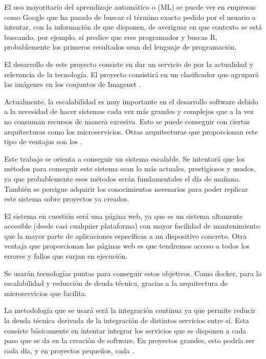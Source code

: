 

El uso mayoritario del aprendizaje automático o  (ML) se puede ver en empresas como Google que ha pasado de buscar el término exacto pedido por el usuario a intentar, con la información de que disponen, de averiguar en que contexto se está buscando, por ejemplo, si predice que eres programador y buscas R, probablemente los primeros resultados sean del lenguaje de programación.

El desarrollo de este proyecto consiste en dar un servicio de  por la actualidad y relevancia de la tecnología. El proyecto consistirá en un clasificador que agrupará las imágenes en los conjuntos de Imagenet \cite{imnet}.

Actualmente, la escalabilidad es muy importante en el desarrollo software debido a la necesidad de hacer sistemas cada vez más grandes y complejos que a la vez no consuman recursos de manera excesiva. Esto se puede conseguir con ciertas arquitecturas como los microservicios. Otras arquitecturas que proporcionan este tipo de ventajas son los  \cite{svlops, svless}.

Este trabajo se orienta a conseguir un sistema escalable. Se intentará que los métodos para conseguir este sistema sean lo más actuales, prestigiosos y usados, ya que probablemente esos métodos serán fundamentales el día de mañana. También se persigue adquirir los conocimientos necesarios para poder replicar este sistema sobre proyectos ya creados.

El sistema en cuestión será una página web, ya que es un sistema altamente accesible (desde casi cualquier plataforma) con mayor facilidad de mantenimiento que la mayor parte de aplicaciones específicas a un dispositivo concreto. Otra ventaja que proporcionan las páginas web es que tendremos acceso a todos los errores y fallos que surjan en ejecución.

Se usarán tecnologías puntas para conseguir estos objetivos. Como docker, para la escalabilidad y reducción de deuda técnica, gracias a la arquitectura de microservicios que facilita.

La metodología que se usará será la integración continua ya que permite reducir la deuda técnica derivada de la integración de distintos servicios entre sí. Esta consiste básicamente en intentar integrar los servicios que se disponen a cada paso que se da en la creación de software. En proyectos grandes, esto podría ser cada día, y en proyectos pequeños, cada .
